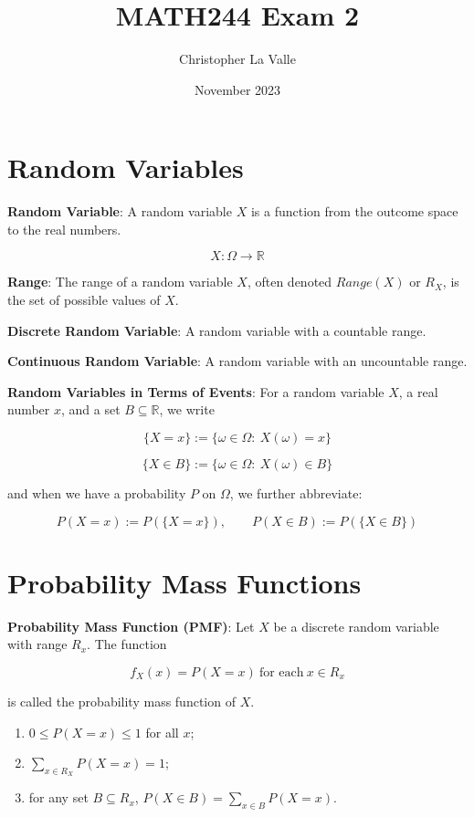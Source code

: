 \documentclass{article}
\title{MATH244 Exam 2}
\author{Christopher La Valle}
\date{November 2023}
\begin{document}
\maketitle

\tableofcontents

\section{Random Variables} 

\textbf{\color{blue}Random  Variable}: A random variable $X$ is a function from the outcome space to the real numbers.

\[X:\Omega\rightarrow\mathbb{R}\]

\noindent\textbf{\color{blue}Range}: The range of a random variable $X$, often denoted $Range(X)$ or $R_X$, is the set of possible values of $X$.

\noindent\textbf{\color{blue}Discrete Random Variable}: A random variable with a countable range.

\noindent\textbf{\color{blue}Continuous Random Variable}: A random variable with an uncountable range.

\noindent\textbf{\color{orange}Random Variables in Terms of Events}: For a random variable $X$, a real number $x$, and a set $B\subseteq\mathbb{R}$, we write

\[\{X=x\}:=\{\omega\in\Omega:\ X(\omega)=x\}\]

\[\{X\in B\}:=\{\omega\in\Omega:\ X(\omega)\in B\}\]

and when we have a probability $P$ on $\Omega$, we further abbreviate:

\[P(X=x):=P(\{X=x\}),\qquad P(X\in B):=P(\{X\in B\})\]

\section{Probability Mass Functions}


\noindent\textbf{\color{blue}Probability Mass Function (PMF)}: Let $X$ be a discrete random variable with range $R_x$. The function

\[f_X(x)=P(X=x)\ \text{for each}\ x\in R_x\]

\noindent is called the probability mass function of $X$.

\begin{enumerate}
    \item $0\le P(X=x)\le1$ for all $x$;
    \item $\underset{x\in R_X}{\sum}P(X=x)=1$;
    \item for any set $B\subseteq R_x$, $P(X\in B)=\underset{x\in B}{\sum}P(X=x)$.
\end{enumerate}
\end{document}

